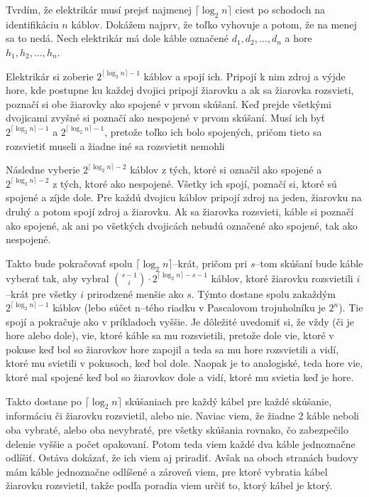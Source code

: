 
Tvrdím, že elektrikár musí prejsť najmenej $\lceil\log_2 n\rceil$ ciest 
po schodoch na identifikáciu $n$ káblov. Dokážem najprv, že toľko 
vyhovuje a potom, že na menej sa to nedá. Nech elektrikár má dole káble 
označené $d_1, d_2,\dots, d_n$ a hore $h_1, h_2,\dots,h_n$.

Elektrikár si zoberie $2^{\lceil\log_2 n\rceil-1}$ káblov a spojí ich. 
Pripojí k nim zdroj a výjde hore, kde postupne ku každej dvojici pripojí 
žiarovku a ak sa žiarovka rozsvieti, poznačí si obe žiarovky ako spojené 
v prvom skúšaní. Keď prejde všetkými dvojicami zvyšné si poznačí ako 
nespojené v prvom skúšaní. Musí ich byť $2^{\lceil\log_2 n\rceil-1}$ a 
$2^{\lceil\log_2 n\rceil-1}$, pretože toľko ich bolo spojených, pričom 
tieto sa rozsvietiť museli a žiadne iné sa rozsvietit nemohli

Následne vyberie $2^{\lceil\log_2 n\rceil-2}$ káblov z tých, ktoré si 
označil ako spojené a $2^{\lceil\log_2 n\rceil-2}$ z tých, ktoré ako 
nespojené. Všetky ich spojí, poznačí si, ktoré sú spojené a zíjde dole. 
Pre každú dvojicu káblov pripojí zdroj na jeden, žiarovku na druhý a 
potom spojí zdroj a žiarovku. Ak sa žiarovka rozsvieti, káble si poznačí 
ako spojené, ak ani po všetkých dvojicách nebudú označené ako spojené, 
tak ako nespojené. 

Takto bude pokračovať spolu $\lceil\log_2 n\rceil$--krát, pričom pri 
$s$--tom skúšaní bude káble vyberať tak, aby vybral 
$\binom{s-1}{i}\cdot 2^{\lceil\log_2 n\rceil-s-1}$ káblov, ktoré žiarovku rozsvietili 
$i$--krát pre všetky $i$ prirodzené menšie ako $s$. Týmto dostane spolu 
zakaždým $2^{\lceil\log_2 n\rceil-1}$ káblov (lebo súčet n--tého riadku 
v Pascalovom trojuholníku je $2^n$). Tie spojí a pokračuje ako 
v príkladoch vyššie. Je dôležité uvedomiť si, že vždy (či je hore alebo 
dole), vie, ktoré káble sa mu rozsvietili, pretože dole vie, ktoré 
v pokuse keď bol so žiarovkov hore zapojil a teda sa mu hore 
rozsvietili a vidí, ktoré mu svietili v pokusoch, keď bol dole. Naopak 
je to analogiské, teda hore vie, ktoré mal spojené keď bol so žiarovkov 
dole a vidí, ktoré mu svietia keď je hore. 

Takto dostane po $\lceil\log_2 n\rceil$ skúšaniach pre každý kábel pre 
každé skúšanie, informáciu či žiarovku rozsvietil, alebo nie. Naviac 
viem, že žiadne 2 káble neboli oba vybraté, alebo oba nevybraté, 
pre všetky skúšania rovnako, čo zabezpečilo delenie vyššie a počet 
opakovaní. Potom teda viem každé dva káble jednoznačne odlíšiť. Ostáva 
dokázať, že ich viem aj priradiť. Avšak na oboch stranách budovy mám 
káble jednoznačne odlíšené a zároveň viem, pre ktoré vybratia kábel 
žiarovku rozsvietil, takže podľa poradia viem určiť to, ktorý kábel je 
ktorý. 


